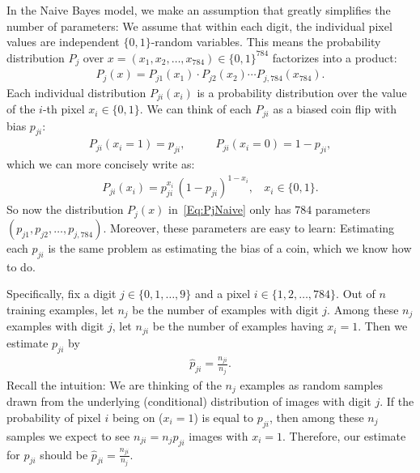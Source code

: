 \documentclass[11pt]{article}
\begin{document}
In the Naive Bayes model, we make an assumption that greatly simplifies the number of parameters: We assume that within each digit, the individual pixel values are independent $\{0,1\}$-random variables. This means the probability distribution $P_j$ over $x = (x_1, x_2, \dots, x_{784}) \in \{0,1\}^{784}$ factorizes into a product:
\begin{align}\label{Eq:PjNaive}
P_j(x) = P_{j1}(x_1) \cdot P_{j2}(x_2) \cdots P_{j,784}(x_{784}).
\end{align}
Each individual distribution $P_{ji}(x_i)$ is a probability distribution over the value of the $i$-th pixel $x_i \in \{0,1\}$. We can think of each $P_{ji}$ as a biased coin flip with bias $p_{ji}$:
\begin{align*}
P_{ji}(x_i = 1) = p_{ji}, ~~~~~~~~~~~~ P_{ji}(x_i = 0) = 1-p_{ji},
\end{align*} 
which we can more concisely write as:
\begin{align}\label{Eq:Pji}
P_{ji}(x_i) = p_{ji}^{x_i} \, (1-p_{ji})^{1-x_i}, ~~~~ x_i \in \{0,1\}.
\end{align}
So now the distribution $P_j(x)$ in~\eqref{Eq:PjNaive} only has $784$ parameters $(p_{j1}, p_{j2}, \dots, p_{j,784})$. Moreover, these parameters are easy to learn: Estimating each $p_{ji}$ is the same problem as estimating the bias of a coin, which we know how to do.

Specifically, fix a digit $j \in \{0,1,\dots,9\}$ and a pixel $i \in \{1,2,\dots,784\}$. Out of $n$ training examples, let $n_j$ be the number of examples with digit $j$. Among these $n_j$ examples with digit $j$, let $n_{ji}$ be the number of examples having $x_i = 1$. Then we estimate $p_{ji}$ by
\begin{align}\label{Eq:pjiEst}
\hat p_{ji} = \frac{n_{ji}}{n_j}.
\end{align}
Recall the intuition: We are thinking of the $n_j$ examples as random samples drawn from the underlying (conditional) distribution of images with digit $j$. If the probability of pixel $i$ being on ($x_i=1$) is equal to $p_{ji}$, then among these $n_j$ samples we expect to see $n_{ji} = n_j p_{ji}$ images with $x_i = 1$. Therefore, our estimate for $p_{ji}$ should be $\hat p_{ji} = \frac{n_{ji}}{n_j}$.
\end{document}
